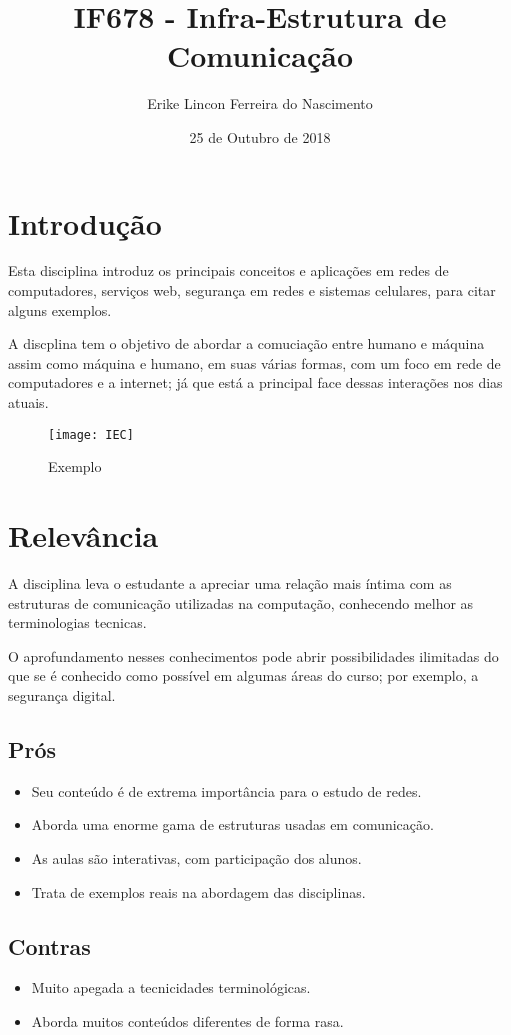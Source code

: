\documentclass{article}
\title{IF678 - Infra-Estrutura de Comunicação}
\author{Erike Lincon Ferreira do Nascimento}
\date{25 de Outubro de 2018}
\begin{document}
\maketitle

\section{Introdução}
 Esta disciplina introduz os principais conceitos e aplicações em redes de computadores, serviços web, segurança em redes e sistemas celulares, para citar alguns exemplos. \par
 A discplina tem o objetivo de abordar a comuciação entre humano e máquina assim como máquina e humano, em suas várias formas, com um foco em rede de computadores e a internet; já que está a principal face dessas interações nos dias atuais.
 
 \begin{figure}[h!]
\centering
\texttt{[image: IEC]}
\caption{Exemplo \cite{gregsubamarine}}
\label{fig:IEC}
\end{figure}

 \section{Relevância}
 A disciplina leva o estudante a apreciar uma relação mais íntima com as estruturas de comunicação utilizadas na computação, conhecendo melhor as terminologias tecnicas. \par
 O aprofundamento nesses conhecimentos pode abrir possibilidades ilimitadas do que se é conhecido como possível em algumas áreas do curso; por exemplo, a segurança digital.
 \subsection{Prós}
 \begin{itemize}
     \item Seu conteúdo é de extrema importância para o estudo de redes.
     \item Aborda uma enorme gama de estruturas usadas em comunicação.
     \item As aulas são interativas, com participação dos alunos.
     \item Trata de exemplos reais na abordagem das disciplinas.
 \end{itemize}
 \subsection{Contras}
 \begin{itemize}
     \item Muito apegada a tecnicidades terminológicas.
     \item Aborda muitos conteúdos diferentes de forma rasa.
 \end{itemize}
\end{document}
